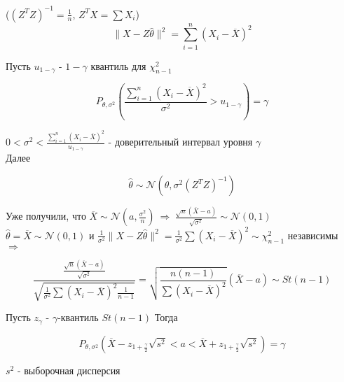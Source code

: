 \documentclass{article}
\begin{document}
($(Z^TZ)^{-1} = \frac{1}{n}$, $Z^TX = \sum{X_i}$)\\

$$\|X - Z\widehat{\theta}\|^2 = \sum_{i=1}^n{(X_i-\overline{X})^2}$$

Пусть $u_{1-\gamma}$ - $1-\gamma$ квантиль для $\chi^2_{n-1}$

$$ P_{\theta,\sigma^2}\left( \frac{\sum_{i=1}^n{(X_i-\overline{X})^2}}{\sigma^2} > u_{1-\gamma}\right) = \gamma $$

$0 < \sigma^2 < \frac{\sum_{i=1}^n{(X_i-\overline{X})^2}}{u_{1-\gamma}}$ - доверительный интервал уровня $\gamma$\\

Далее

$$\widehat{\theta}\sim\mathcal{N}(\theta,\sigma^2(Z^TZ)^{-1})$$

Уже получили, что $\overline{X}\sim\mathcal{N}\left(a, \frac{\sigma^2}{n}\right)\ \Rightarrow\ 
\frac{\sqrt{n}(\overline{X} -a)}{\sqrt{\sigma^2}}\sim\mathcal{N}(0,1)$\\

$\widehat{\theta} = \overline{X} \sim \mathcal{N}(0,1)$ и $\frac{1}{\sigma^2}\|X - Z\widehat{\theta}\|^2 = \frac{1}{\sigma^2}\sum(X_i-\overline{X})^2 \sim\chi^2_{n-1}$ независимы\\
$\Rightarrow$

$$\frac{\frac{\sqrt{n}(\overline{X} -a)}{\sqrt{\sigma^2}}}{\sqrt{ \frac{1}{\sigma^2}\sum(X_i-\overline{X})^2 \frac{1}{n-1} }} = \sqrt{\frac{n(n-1)}{\sum(X_i-\overline{X})^2}}\left( \overline{X} - a \right)\sim St(n-1)$$


Пусть $z_\gamma$ - $\gamma$-квантиль $St(n-1)$ Тогда

$$ P_{\theta,\sigma^2}\left( \overline{X} - z_{1 + \frac{\gamma}{2}}\sqrt{s^2} < a < \overline{X} + z_{1 + \frac{\gamma}{2}}\sqrt{s^2}    \right) = \gamma $$

$s^2$ - выборочная дисперсия\\
\end{document}
